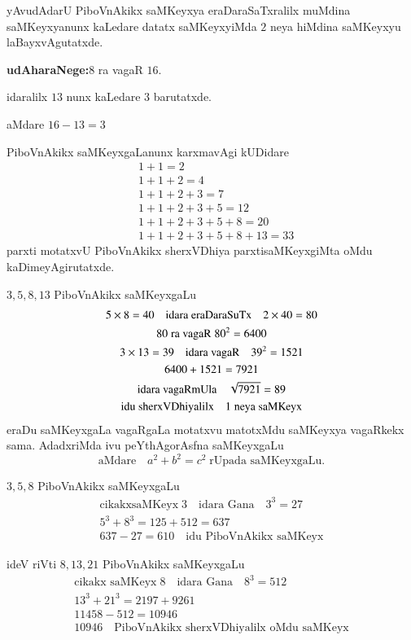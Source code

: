 yAvudAdarU PiboVnAkikx saMKeyxya eraDaraSaTxralilx muMdina saMKeyxyanunx kaLedare datatx saMKeyxyiMda $2$ neya hiMdina saMKeyxyu laBayxvAgutatxde.

\textbf{udAharaNege:}\quad $8$ ra vagaR $16$.

idaralilx $13$ nunx  kaLedare $3$ barutatxde.

aMdare $16-13 =3$

PiboVnAkikx saMKeyxgaLanunx karxmavAgi kUDidare
\begin{align*}
&1+1=2\\
&1+1+2=4\\
&1+1+2+3=7\\
&1+1+2+3+5=12\\
&1+1+2+3+5+8=20\\
&1+1+2+3+5+8+13=33
\end{align*}
parxti motatxvU PiboVnAkikx sherxVDhiya parxtisaMKeyxgiMta oMdu kaDimeyAgirutatxde.

$3,5,8,13$ PiboVnAkikx saMKeyxgaLu
\begin{gather*}
5\times 8 =40 \quad \text{idara eraDaraSuTx} \quad 2\times 40 = 80\\
80 \;\text{ra vagaR}\; 80^2 = 6400\\
3\times 13 =39 \quad \text{idara vagaR} \quad 39^2 = 1521\\
6400+1521 = 7921 \\
\text{idara vagaRmUla} \quad\sqrt{7921} =89\\
\text{idu sherxVDhiyalilx}\quad {\rm 1}\;\text{neya saMKeyx} 
\end{gather*}
eraDu saMKeyxgaLa vagaRgaLa motatxvu matotxMdu saMKeyxya vagaRkekx sama. AdadxriMda ivu peYthAgorAsfna saMKeyxgaLu
$$
\text{aMdare}\quad a^2+b^2=c^2 \;\text{rUpada saMKeyxgaLu.}
$$

$3,5,8$ PiboVnAkikx saMKeyxgaLu
\begin{gather*}
\text{cikakxsaMKeyx}\; 3 \quad \text{idara Gana} \quad 3^3 = 27\\
5^{3}+8^{3} = 125+512 = 637\\
637-27 = 610 \quad\text{idu PiboVnAkikx saMKeyx}
\end{gather*}

ideV riVti $8,13,21$ PiboVnAkikx saMKeyxgaLu
\begin{gather*}
\text{cikakx saMKeyx}\;8 \quad \text{idara Gana} \quad 8^3=512\\
13^3+21^3 = 2197+9261\\
11458-512 = 10946\\
10946 \quad\text{PiboVnAkikx sherxVDhiyalilx oMdu saMKeyx} 
\end{gather*}

